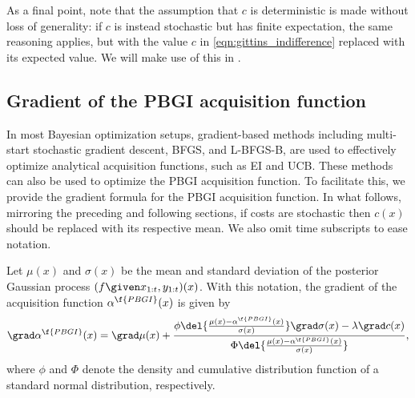 \documentclass{article}
\begin{document}
As a final point, note that the assumption that $c$ is deterministic is made without loss of generality: if $c$ is instead stochastic but has finite expectation, the same reasoning applies, but with the value $c$ in \eqref{eqn:gittins_indifference} replaced with its expected value.
We will make use of this in .

\subsection{Gradient of the PBGI acquisition function}
\label{apdx:theory:gradient}

In most Bayesian optimization setups, gradient-based methods including multi-start stochastic gradient descent, BFGS, and L-BFGS-B, are used to effectively optimize analytical acquisition functions, such as EI and UCB. These methods can also be used to optimize the PBGI acquisition function. 
To facilitate this, we provide the gradient formula for the PBGI acquisition function.
In what follows, mirroring the preceding and following sections, if costs are stochastic then $c(x)$ should be replaced with its respective mean.
We also omit time subscripts to ease notation.

\begin{proposition}
Let $\mu(x)$ and $\sigma(x)$ be the mean and standard deviation of the posterior Gaussian process $(f\given x_{1:t}, y_{1:t})(x)$.
With this notation, the gradient of the acquisition function $\alpha^{\f{PBGI}}(x)$ is given by
\[
\grad \alpha^{\f{PBGI}}(x) = \grad\mu(x) + \frac{\phi\del{\frac{\mu(x)-\alpha^{\f{PBGI}}(x)}{\sigma(x)}}\grad\sigma(x)-\lambda\grad c(x)}{\Phi\del{\frac{\mu(x)-\alpha^{\f{PBGI}}(x)}{\sigma(x)}}},
\]
where $\phi$ and $\Phi$ denote the density and cumulative distribution function of a standard normal distribution, respectively.
\end{proposition}
\end{document}
